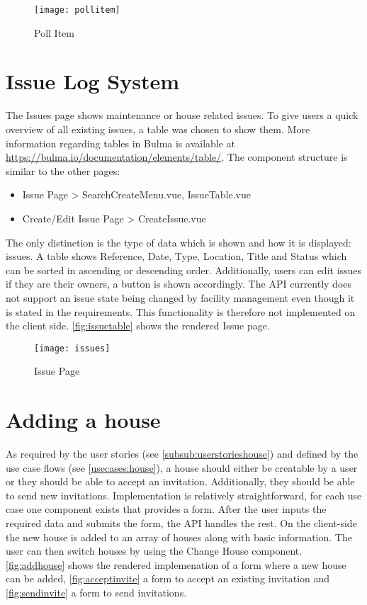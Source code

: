 \begin{figure}[H]
  \begin{center}
  \texttt{[image: pollitem]}
  \end{center}
  \caption{Poll Item}
  \label{fig:pollitem}
\end{figure}

\section{Issue Log System} \label{issuelogs}
The Issues page shows maintenance or house related issues. To give users a quick overview of all existing issues, a table was chosen to show them. More information regarding tables in Bulma is available at \url{https://bulma.io/documentation/elements/table/}. The component structure is similar to the other pages: \newline

\begin{itemize}
  \item Issue Page > SearchCreateMenu.vue, IssueTable.vue
  \item Create/Edit Issue Page > CreateIssue.vue
\end{itemize}

The only distinction is the type of data which is shown and how it is displayed: issues. A table shows Reference, Date,  Type, Location, Title and Status which can be sorted in ascending or descending order. Additionally, users can edit issues if they are their owners, a button is shown accordingly. The API currently does not support an issue state being changed by facility management even though it is stated in the requirements. This functionality is therefore not implemented on the client side. \autoref{fig:issuetable} shows the rendered Issue page.

\begin{figure}[H]
  \begin{center}
  \texttt{[image: issues]}
  \end{center}
  \caption{Issue Page}
  \label{fig:issuetable}
\end{figure}

\section{Adding a house}
As required by the user stories (see \autoref{subsub:userstorieshouse}) and defined by the use case flows (see \autoref{usecases:house}), a house should either be creatable by a user or they should be able to accept an invitation. Additionally, they should be able to send new invitations. Implementation is relatively straightforward, for each use case one component exists that provides a form. After the user inputs the required data and submits the form, the API handles the rest. On the client-side the new house is added to an array of houses along with basic information. The user can then switch houses by using the Change House component. \autoref{fig:addhouse} shows the rendered implemenation of a form where a new house can be added, \autoref{fig:acceptinvite} a form to accept an existing invitation and \autoref{fig:sendinvite} a form to send invitations.

